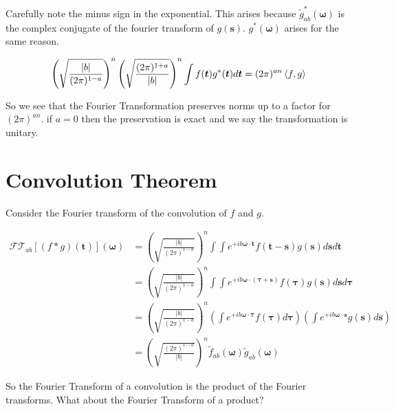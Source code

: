 \documentclass[12pt]{article}
\newcommand{\bv}[1]{\boldsymbol{#1}}
\begin{document}
Carefully note the minus sign in the exponential. This arises because $\tilde{g}^*_{ab}(\bv{\omega})$ is the complex conjugate of the fourier transform of $g(\bv{s})$. $g^*(\bv{\omega})$ arises for the same reason.

\begin{align}
\left(\sqrt{\frac{|b|}{(2\pi)^{1-a}}}\right)^n \left(\sqrt{\frac{(2\pi)^{1+a}}{|b|}}\right)^n \int f(\bv{t}) g^*(\bv{t}) d\bv{t} = (2\pi)^{an} \Braket{f,g}
\end{align}

So we see that the Fourier Transformation preserves norms up to a factor for $(2\pi)^{an}$. if $a=0$ then the preservation is exact and we say the transformation is unitary.

\section{Convolution Theorem}

Consider the Fourier transform of the convolution of $f$ and $g$.

\begin{align*}
\mathcal{FT}_{ab}[(f \ast g)(\bv{t})](\bv{\omega}) &= \left(\sqrt{\frac{|b|}{(2\pi)^{1-a}}}\right)^n\int \int e^{+ib\bv{\omega} \cdot \bv{t}} f(\bv{t}-\bv{s})g(\bv{s}) d\bv{s} d\bv{t}\\
&=  \left(\sqrt{\frac{|b|}{(2\pi)^{1-a}}}\right)^n \int \int e^{+ib \bv{\omega} \cdot (\bv{\tau}+\bv{s})} f(\bv{\tau}) g(\bv{s}) d\bv{s} d\bv{\tau}\\
&= \left(\sqrt{\frac{|b|}{(2\pi)^{1-a}}}\right)^n\left(\int e^{+ib\bv{\omega} \cdot \bv{\tau}} f(\bv{\tau}) d\bv{\tau}\right)\left(\int e^{+ib\bv{\omega} \cdot \bv{s}} g(\bv{s}) d\bv{s}\right)\\
&=\left(\sqrt{\frac{(2\pi)^{1-a}}{|b|}}\right)^n \tilde{f}_{ab}(\bv{\omega}) \tilde{g}_{ab}(\bv{\omega})
\end{align*}

So the Fourier Transform of a convolution is the product of the Fourier transforms. What about the Fourier Transform of a product?
\end{document}
